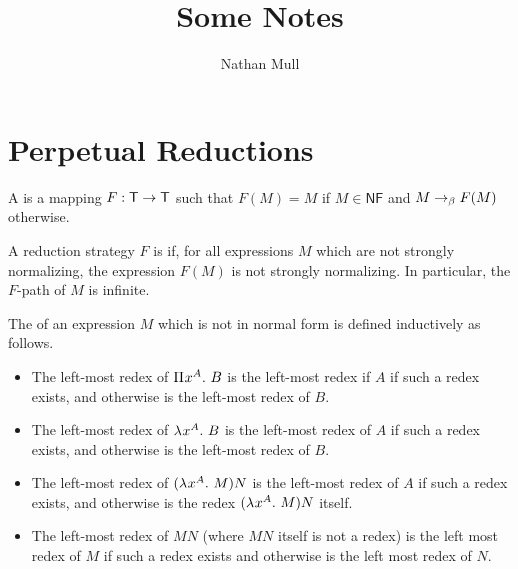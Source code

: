 \documentclass{article}
\title{Some Notes}
\author{Nathan Mull}
\begin{document}
\maketitle


\section{Perpetual Reductions}


\begin{definition}
A  is a mapping $F : \mathsf{T} \to \mathsf{T}$ such that $F(M) = M$ if $M \in \mathsf{NF}$ and $M \rightarrow_\beta F(M)$ otherwise.
\end{definition}



\begin{definition}
A reduction strategy $F$ is  if, for all expressions $M$ which are not strongly normalizing, the expression $F(M)$ is not strongly normalizing.
In particular, the $F$-path of $M$ is infinite.
\end{definition}

\begin{definition}
  The  of an expression $M$ which is not in normal form is defined inductively as follows.
  \begin{itemize}
    \item The left-most redex of ${\Pi^{} {x}^{A}. \ {B}}$ is the left-most redex if $A$ if such a redex exists, and otherwise is the left-most redex of $B$.
    \item The left-most redex of $\lambda^{} x^{A}. \ B$ is the left-most redex of $A$ if such a redex exists, and otherwise is the left-most redex of $B$.
    \item The left-most redex of $(\lambda^{} x^{A}. \ M) N$ is the left-most redex of $A$ if such a redex exists, and otherwise is the redex $(\lambda^{} x^{A}. \ M) N$ itself.
    \item The left-most redex of $M N$ (where $MN$ itself is not a redex) is the left most redex of $M$ if such a redex exists and otherwise is the left most redex of $N$.
  \end{itemize}
\end{definition}
\end{document}
